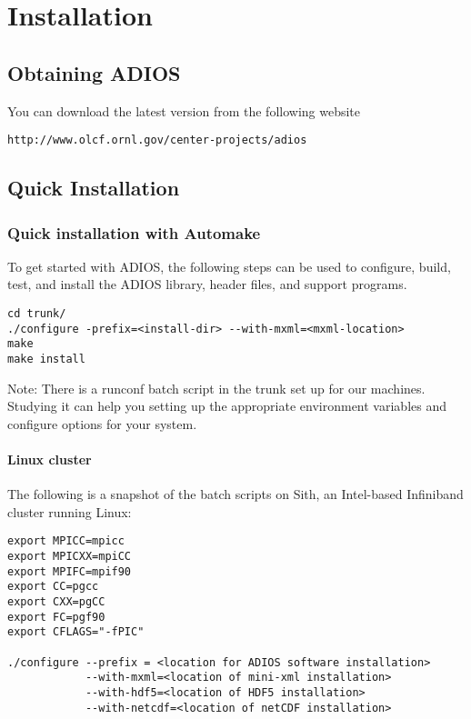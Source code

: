 \chapter{Installation}

\section{Obtaining ADIOS}

You can download the latest version from the following website 

\begin{lstlisting}[language={}]
http://www.olcf.ornl.gov/center-projects/adios
\end{lstlisting}


\section{Quick Installation}

\subsection{Quick installation with Automake}

To get started with ADIOS, the following steps can be used to configure, build, 
test, and install the ADIOS library, header files, and support programs. 

\begin{lstlisting}
cd trunk/
./configure -prefix=<install-dir> --with-mxml=<mxml-location>
make
make install
\end{lstlisting}

Note: There is a runconf batch script in the trunk set up for our machines. Studying 
it can help you setting up the appropriate environment variables and configure 
options for your system.

\subsubsection{Linux cluster}

The following is a snapshot of the batch scripts on Sith, an Intel-based Infiniband 
cluster running Linux:

\begin{lstlisting}
export MPICC=mpicc
export MPICXX=mpiCC
export MPIFC=mpif90
export CC=pgcc
export CXX=pgCC
export FC=pgf90
export CFLAGS="-fPIC"

./configure --prefix = <location for ADIOS software installation>
            --with-mxml=<location of mini-xml installation>
            --with-hdf5=<location of HDF5 installation>
            --with-netcdf=<location of netCDF installation>
\end{lstlisting}


